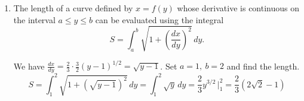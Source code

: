 \documentclass[a4paper, 12pt]{article}
\renewcommand{\headrulewidth}{0pt}
\renewcommand{\headrulewidth}{0pt}
\begin{document}
\begin{enumerate}[leftmargin=*,label=\textbf{\arabic*.}]
The integral diverges to negative infinity.
\item The length of a curve defined by $x=f(y)$ whose derivative is continuous on the interval $a\leq y\leq b$ can be evaluated using the integral
\[S=\int_a^b\sqrt{1+\left(\frac{dx}{dy}\right)^2}\,dy.\]

We have $\displaystyle\frac{dx}{dy}=\frac23\cdot\frac32(y-1)^{1/2}=\sqrt{y-1}$. Set $a=1,\:b=2$ and find the length.
\[S=\int_1^2\sqrt{1+\left(\sqrt{y-1}\right)^2}\,dy=\int_1^2\sqrt{y}\,dy=\frac23y^{3/2}\,\bigg|_1^2=\boxed{\frac23(2\sqrt2-1)}\]
\end{enumerate}

\newpage
{}
{}

\newpage
\pagestyle{fancy}
\renewcommand{\headrulewidth}{1pt}

\end{document}

